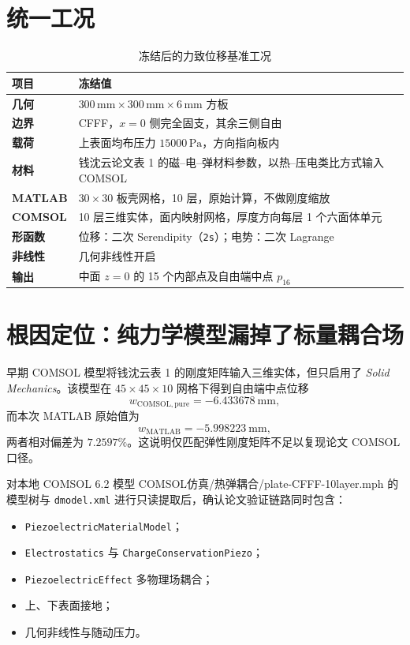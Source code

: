 \documentclass[UTF8,fontset=windows,12pt,a4paper]{ctexart}
\newcommand{\code}[1]{\texttt{#1}}
\begin{document}
\section{统一工况}

\begin{table}[H]
\centering
\caption{冻结后的力致位移基准工况}
\label{tab:case}
\begin{tabularx}{\textwidth}{>{\bfseries}lX}
\toprule
项目 & 冻结值 \\
\midrule
几何 & $300\,\mathrm{mm}\times300\,\mathrm{mm}\times6\,\mathrm{mm}$ 方板 \\
边界 & CFFF，$x=0$ 侧完全固支，其余三侧自由 \\
载荷 & 上表面均布压力 $15000\,\mathrm{Pa}$，方向指向板内 \\
材料 & 钱沈云论文表 1 的磁--电--弹材料参数，以热--压电类比方式输入 COMSOL \\
MATLAB & $30\times30$ 板壳网格，10 层，原始计算，不做刚度缩放 \\
COMSOL & 10 层三维实体，面内映射网格，厚度方向每层 1 个六面体单元 \\
形函数 & 位移：二次 Serendipity（\code{2s}）；电势：二次 Lagrange \\
非线性 & 几何非线性开启 \\
输出 & 中面 $z=0$ 的 15 个内部点及自由端中点 $p_{16}$ \\
\bottomrule
\end{tabularx}
\end{table}

\section{根因定位：纯力学模型漏掉了标量耦合场}

早期 COMSOL 模型将钱沈云表 1 的刚度矩阵输入三维实体，但只启用了 \emph{Solid Mechanics}。该模型在 $45\times45\times10$ 网格下得到自由端中点位移
\[
  w_{\mathrm{COMSOL,pure}}=-6.433678\ \mathrm{mm},
\]
而本次 MATLAB 原始值为
\[
  w_{\mathrm{MATLAB}}=-5.998223\ \mathrm{mm},
\]
两者相对偏差为 $7.2597\%$。这说明仅匹配弹性刚度矩阵不足以复现论文 COMSOL 口径。

对本地 COMSOL 6.2 模型 {\small{} COMSOL仿真/热弹耦合/plate-CFFF-10layer.mph} 的模型树与 \code{dmodel.xml} 进行只读提取后，确认论文验证链路同时包含：
\begin{itemize}
  \item \code{PiezoelectricMaterialModel}；
  \item \code{Electrostatics} 与 \code{ChargeConservationPiezo}；
  \item \code{PiezoelectricEffect} 多物理场耦合；
  \item 上、下表面接地；
  \item 几何非线性与随动压力。
\end{itemize}
\end{document}
